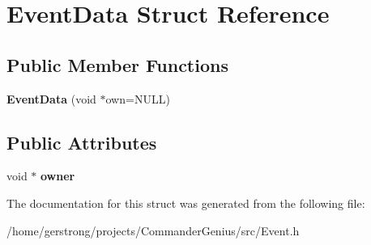 \hypertarget{struct_event_data}{
\section{EventData Struct Reference}
\label{struct_event_data}
}
\subsection*{Public Member Functions}
\begin{DoxyCompactItemize}
\item 
\hypertarget{struct_event_data_abfb37283e48de85dc59e4693a10f829c}{
{\bfseries EventData} (void $\ast$own=NULL)}
\label{struct_event_data_abfb37283e48de85dc59e4693a10f829c}

\end{DoxyCompactItemize}
\subsection*{Public Attributes}
\begin{DoxyCompactItemize}
\item 
\hypertarget{struct_event_data_aed8b8690a60aac5b0bb0ce4c70fdc9b8}{
void $\ast$ {\bfseries owner}}
\label{struct_event_data_aed8b8690a60aac5b0bb0ce4c70fdc9b8}

\end{DoxyCompactItemize}


The documentation for this struct was generated from the following file:\begin{DoxyCompactItemize}
\item 
/home/gerstrong/projects/CommanderGenius/src/Event.h\end{DoxyCompactItemize}
